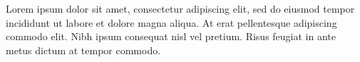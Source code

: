 \thispagestyle{empty}

\vfill
Lorem ipsum dolor sit amet, consectetur adipiscing elit, sed do eiusmod tempor incididunt ut labore et dolore magna aliqua. At erat pellentesque adipiscing commodo elit. Nibh ipsum consequat nisl vel pretium. Risus feugiat in ante metus dictum at tempor commodo. 
\vfill